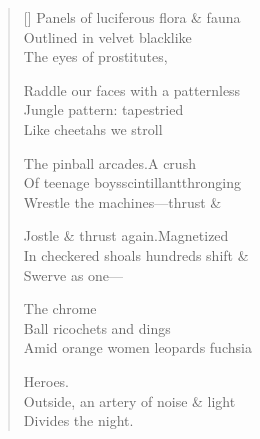 \label{ch:in_the_arcades}
\settowidth{\versewidth}{Of teenage boys\qquad scintillant\qquad thronging}
\begin{verse}[\versewidth]
Panels of luciferous flora \& fauna\\
Outlined in velvet black\qquad like\\
The eyes of prostitutes,

Raddle our faces with a patternless\\
Jungle pattern: tapestried\\
Like cheetahs we stroll

The pinball arcades.\qquad A crush\\
Of teenage boys\qquad scintillant\qquad thronging\\
Wrestle the machines---thrust \&

Jostle \& thrust again.\qquad Magnetized\\
In checkered shoals hundreds shift \&\\
Swerve as one---

\hspace*{4\vgap} The chrome\\
Ball ricochets and dings\\
Amid orange women leopards fuchsia

\hspace*{4\vgap} Heroes.\\
Outside, an artery of noise \& light\\
Divides the night.
\end{verse}
